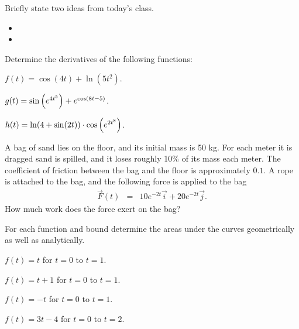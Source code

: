 \postClass

\begin{problem}
\item Briefly state two ideas from today's class.
  \begin{itemize}
  \item 
  \item 
  \end{itemize}
\item Determine the derivatives of the following functions:
  \begin{subproblem}
  \item $f(t) = \cos(4t) + \ln(5t^2)$.
    \vfill
  \item $g(t) = \sin\left( e^{4t^5} \right)  + e^{\cos\left( 8t-5 \right)}$.
    \vfill
  \item $h(t) = \ln(4+\sin(2t) ) \cdot \cos \left( e^{2t^8} \right)$.
    \vfill
  \end{subproblem}

  \clearpage

\item A bag of sand lies on the floor, and its initial mass is 50
  kg. For each meter it is dragged sand is spilled, and it loses
  roughly 10\% of its mass each meter. The coefficient of friction
  between the bag and the floor is approximately $0.1$. A rope is
  attached to the bag, and the following force is applied to the bag
  \begin{eqnarray*}
    \vec{F}(t) & = & 10e^{-2t} \vec{i} + 20 e^{-2t} \vec{j}.
  \end{eqnarray*}
  How much work does the force exert on the bag?

  \vfill


\end{problem}


\begin{problem}
\item For each function and bound determine the areas under the curves
  geometrically as well as analytically. 
  \begin{subproblem}
  \item $f(t)=t$ for $t=0$ to $t=1$.
    \vfill
  \item $f(t)=t+1$ for $t=0$ to $t=1$.
    \vfill
  \item $f(t)=-t$ for $t=0$ to $t=1$.
    \vfill
  \item $f(t)=3t-4$ for $t=0$ to $t=2$.
    \vfill
  \end{subproblem}
\end{problem}



